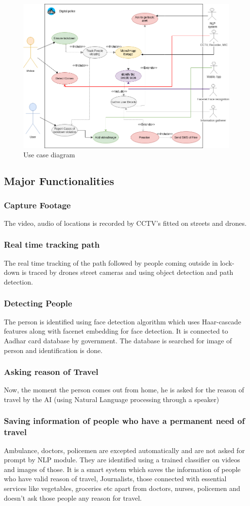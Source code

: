 \documentclass[10pt,twocolumn,letterpaper]{article}
\begin{document}
 \begin{figure}
    \includegraphics[width=.5\textwidth,height=.8\textheight,keepaspectratio]{images/usecase_diagram.png} 
      \caption{Use case diagram}
\end{figure}
\subsection{Major Functionalities}
\subsubsection{Capture Footage}The video, audio of locations is recorded by CCTV's fitted on streets and drones.
\subsubsection{Real time tracking path} The real time tracking of the path followed by people coming outside in lock-down is traced by drones street cameras and using object detection and path detection.
\subsubsection{Detecting People}The person is identified using face detection algorithm which uses Haar-cascade features along with facenet embedding for face detection. It is connected to Aadhar card database by government. The database is searched for image of person and identification is done. 
\subsubsection{Asking reason of Travel} Now, the moment the person comes out from home, he is asked for the reason of travel by the AI (using Natural Language processing through a speaker)
\subsubsection{Saving information of people who have a permanent need of travel}
 Ambulance, doctors, policemen are excepted automatically and are not asked for prompt by NLP module. They are identified using a trained classifier on videos and images of those.
 It is a smart system which saves the information of people who have valid reason of travel, Journalists, those connected with essential services like vegetables, groceries etc apart from doctors, nurses, policemen and doesn't ask those people any reason for travel.
\end{document}
